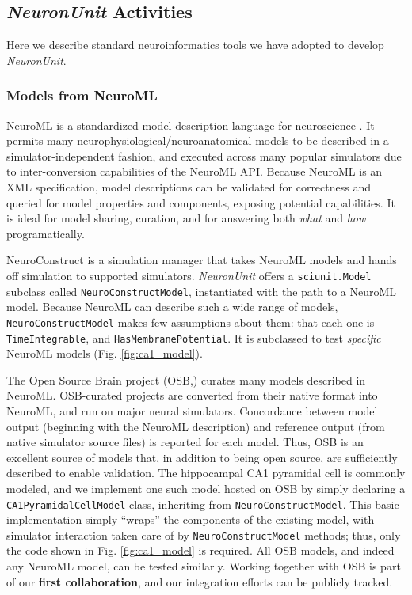 \documentclass[11pt,letterpaper]{article}
\let\verbx\lstinline
\begin{document}
\subsection{\textit{NeuronUnit} Activities}
\label{sec:neuronunit_acitivities}
Here we describe standard neuroinformatics tools we have adopted to develop \textit{NeuronUnit}\cite{neurounit_url}.  

\subsubsection{Models from NeuroML}\label{sec:neuroml_models}
NeuroML is a standardized model description language for neuroscience \cite{gleeson_neuroml:_2010}. 
It permits many neurophysiological/neuroanatomical models to be described in a simulator-independent fashion, and executed across many popular simulators due to inter-conversion capabilities of the NeuroML API. 
Because NeuroML is an XML specification, model descriptions can be validated for correctness and queried for model properties and components, exposing potential capabilities. 
It is ideal for model sharing, curation, and for answering both \textit{what} and \textit{how} programatically.  

NeuroConstruct\cite{neuroconstruct_url,gleeson_neuroconstruct:_2007} is a simulation manager that takes NeuroML models and hands off simulation to supported simulators. 
\textit{NeuronUnit} offers a \verbx{sciunit.Model} subclass called \verbx{NeuroConstructModel}, instantiated with the path to a NeuroML model.  
Because NeuroML can describe such a wide range of models, \verbx{NeuroConstructModel} makes few assumptions about them: that each one is \verbx{TimeIntegrable}, and \verbx{HasMembranePotential}.  
It is subclassed to test \textit{specific} NeuroML models (Fig. \ref{fig:ca1_model}). 

The Open Source Brain project (OSB,\cite{osb_url}) curates many models described in NeuroML. 
OSB-curated projects are converted from their native format into NeuroML, and run on major neural simulators\cite{neuron_url,genesis_url,nest_url,moose_url}. 
Concordance between model output (beginning with the NeuroML description) and reference output (from native simulator source files) is reported for each model. 
Thus, OSB is an excellent source of models that, in addition to being open source, are sufficiently described to enable validation. 
The hippocampal CA1 pyramidal cell is commonly modeled, and we implement one such model hosted on OSB\cite{osb_ca1_url} by simply declaring a \verbx{CA1PyramidalCellModel} class, inheriting from \verbx{NeuroConstructModel}.  
This basic implementation simply ``wraps'' the components of the existing model, with simulator interaction taken care of by \verbx{NeuroConstructModel} methods; 
thus, only the code shown in Fig. \ref{fig:ca1_model} is required. 
All OSB models, and indeed any NeuroML model, can be tested similarly. 
Working together with OSB is part of our \textbf{first collaboration}, and our integration efforts can be publicly tracked\cite{neuroconstruct_rgerkin_url}.  
\end{document}
